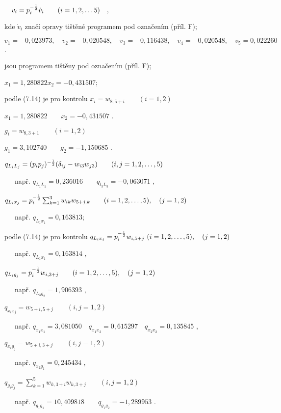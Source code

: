  $\quad v_i = p_i^{-{1\over2}} \dot v_i \qquad (i=1,2,\dots5) \quad,$

\smallskip
kde $\dot v_i$ značí opravy tištěné programem pod označením
 (příl. F);

$v_1=-0,023973,\quad v_2=-0,020548,\quad v_3=-0,116438,\quad v_4=-0,020548,\quad v_5=0,022260$ .

 jsou programem tištěny pod označením  (příl. F);

$x_1=1,280822 x_2=-0,431507 $;

\noindent
podle (7.14) je pro kontrolu $x_i = w_{8,5+i}\qquad (i=1,2)$

$x_1=1,280822\qquad x_2=-0,431507$ .

 $g_i = w_{8,3+1}\qquad (i=1,2)$

\smallskip
$g_1 = 3,102740 \qquad g_2=-1,150685$ .


$q_{L_iL_j} = (p_ip_j)^{-{1\over2}} (\delta_{ij} - w_{i3}w_{j3}) \qquad (i,j=1,2,\ldots,5)$

\smallskip
~~~např. $q_{L_1L_1} =0,236016 \qquad q_{l_3L_5} = -0,063071$ ,

$q_{L_ix_j} = p_i^{-{1\over2}} \sum_{k=1}^3 w_{ik}w_{5+j,k} \qquad (i=1,2,\ldots,5),\quad (j=1,2)$

\smallskip
~~~např. $ q_{L_1x_1} =0,163813 $;


\noindent
podle (7.14) je pro kontrolu $q_{L_ix_j} = p_i^{-{1\over2}} w_{i,5+j} \
(i=1,2,\ldots,5),\quad(j=1,2)$

\smallskip
~~~např. $q_{L_1x_1} = 0,163814 $ ,

$q_{L_ig_j} = p_i^{-{1\over2}} w_{i,3+j} \qquad (i=1,2,\ldots,5), \quad (j=1,2)$

\smallskip
~~~např. $q_{L_3g_2} = 1,906393 $ ,

$q_{x_ix_j} = w_{5+i,5+j} \qquad (i,j=1,2)$

\smallskip
~~~např. $q_{x_1x_1} = 3,081050 \quad  q_{x_1x_2} = 0,615297 \quad q_{x_2x_2} =0,135845 $ ,

$q_{x_ig_j} = w_{5+i,3+j} \qquad (i,j=1,2)$

\smallskip
~~~např. $q_{x_2g_1} = 0,245434 $ ,

$q_{g_ig_j} =\sum_{k=1}^5 w_{k,3+i} w_{k,3+j} \qquad (i,j=1,2)$

\smallskip
~~~např. $q_{g_1g_1} = 10,409818\qquad q_{g_1g_2} = -1,289953 $ .
